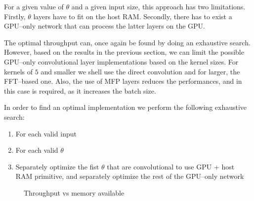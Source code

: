 \documentclass[conference]{./IEEEtran/IEEEtran}
\begin{document}
  For a given value of $\theta$ and a given input size, this approach
  has two limitations.  Firstly, $\theta$ layers have to fit on the
  host RAM.  Secondly, there has to exist a GPU--only network that can
  process the latter layers on the GPU.

  The optimal throughput can, once again be found by doing an
  exhaustive search.  However, based on the results in the previous
  section, we can limit the possible GPU--only convolutional layer
  implementations based on the kernel sizes.  For kernels of $5$ and
  smaller we shell use the direct convolution and for larger, the
  FFT--based one.  Also, the use of MFP layers reduces the
  performances, and in this case is required, as it increases the
  batch size.

  In order to find an optimal implementation we perform the following
  exhaustive search:

  \begin{enumerate}
    \item For each valid input
    \item For each valid $\theta$
    \item Separately optimize the fist $\theta$ that are convolutional
      to use GPU + host RAM primitive, and separately optimize the
      rest of the GPU--only network
  \end{enumerate}

  \begin{figure}[!htbp]
    \centering

    \caption{Throughput vs memory available
    }
    \label{fig:final_results}
  \end{figure}
\end{document}
